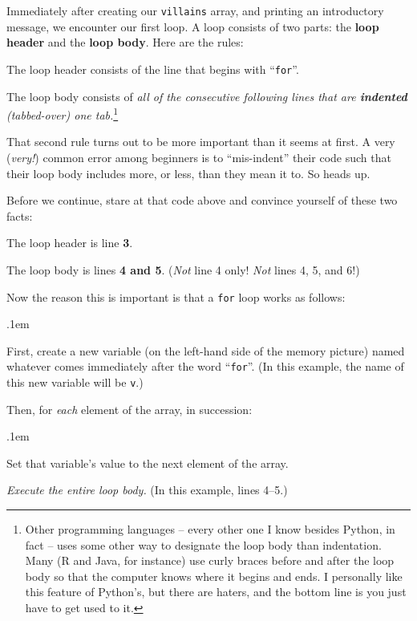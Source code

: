 Immediately after creating our \texttt{villains} array, and printing an
introductory message, we encounter our first loop. A loop consists of two
parts: the \textbf{loop header} and the \textbf{loop body}. Here are the rules:


\begin{compactitem}
\item The loop header consists of the line that begins with ``\texttt{for}''.
\item The loop body consists of \textit{all of the consecutive following lines
that are \textbf{indented} (tabbed-over) one tab.}\footnote{Other programming
languages -- every other one I know besides Python, in fact -- uses some other
way to designate the loop body than indentation. Many (R and Java, for
instance) use curly braces before and after the loop body so that the computer
knows where it begins and ends. I personally like this feature of Python's, but
there are haters, and the bottom line is you just have to get used to it.}
\end{compactitem}

That second rule turns out to be more important than it seems at first. A very
(\textit{very!}) common error among beginners is to ``mis-indent'' their code
such that their loop body includes more, or less, than they mean it to. So
heads up.

Before we continue, stare at that code above and convince yourself of these two
facts:

\begin{compactitem}
\item[\leftpointright] The loop header is line \textbf{3}.
\item[\leftpointright] The loop body is lines \textbf{4 and 5}. (\textit{Not} line 4
only! \textit{Not} lines 4, 5, and 6!)
\end{compactitem}

\medskip
Now the reason this is important is that a \texttt{for} loop works as follows:
\vspace{-.1in}


\begin{shaded}
\begin{compactenum}
\itemsep.1em
\item First, create a new variable (on the left-hand side of the memory
picture) named whatever comes immediately after the word ``\texttt{for}''. (In
this example, the name of this new variable will be \texttt{v}.)
\item Then, for \textit{each} element of the array, in succession:
    \begin{compactenum}
    \itemsep.1em
    \item Set that variable's value to the next element of the array.
    \item \textit{Execute the entire loop body.} (In this example, lines 4--5.)
    \end{compactenum}
\end{compactenum}
\end{shaded}

